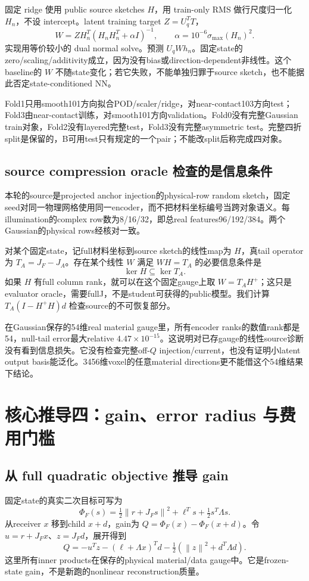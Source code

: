 \documentclass[UTF8,11pt,a4paper,fontset=fandol]{ctexart}
\newcommand{\norm}[1]{\left\lVert #1\right\rVert}
\begin{document}
固定 ridge 使用 public source sketches $H$，用 train-only RMS 做行尺度归一化 $H_n$，不设 intercept。latent training target $Z=U_q^TT$，
\[
 W=ZH_n^T(H_nH_n^T+\alpha I)^{-1},\qquad
 \alpha=10^{-6}\sigma_{\max}(H_n)^2.
\]
实现用等价较小的 dual normal solve。预测 $U_qW h_n$。固定state的zero/scaling/additivity成立，因为没有bias或direction-dependent非线性。这个baseline的 $W$ 不随state变化；若它失败，不能单独归罪于source sketch，也不能据此否定state-conditioned NN。

Fold1只用smooth101方向拟合POD/scaler/ridge，对near-contact103方向test；Fold3由near-contact训练，对smooth101方向validation。Fold0没有完整Gaussian train对象，Fold2没有layered完整test，Fold3没有完整asymmetric test。完整四折split是保留的，B可用test只有规定的一个pair；不能改split后称完成四对象。

\subsection{source compression oracle 检查的是信息条件}
本轮的source是projected anchor injection的physical-row random sketch，固定seed对同一物理网格使用同一encoder，而不把材料坐标编号当跨对象语义。每illumination的complex row数为8/16/32，即总real features96/192/384。两个Gaussian的physical rows经核对一致。

对某个固定state，记full材料坐标到source sketch的线性map为 $H$，真tail operator为 $T_A=J_F-J_A$。存在某个线性 $W$ 满足 $WH=T_A$ 的必要信息条件是
\[
 \ker H\subseteq\ker T_A.
\]
如果 $H$ 有full column rank，就可以在这个固定gauge上取 $W=T_AH^+$；这只是 evaluator oracle，需要fullJ，不是student可获得的public模型。我们计算 $T_A(I-H^+H)d$ 检查source的不可恢复部分。

在Gaussian保存的54维real material gauge里，所有encoder ranks的数值rank都是54，null-tail error最大relative $4.47\times10^{-15}$。这说明对已存gauge的线性source诊断没有看到信息损失。它没有检查完整off-$Q$ injection/current，也没有证明小latent output basis能泛化。3456维voxel的任意material directions更不能借这个54维结果下结论。

\section{核心推导四：gain、error radius 与费用门槛}
\subsection{从 full quadratic objective 推导 gain}
固定state的真实二次目标可写为
\[
 \Phi_F(s)=\tfrac12\norm{r+J_Fs}^2+\ell^Ts+\tfrac12s^T\Lambda s.
\]
从receiver $x$ 移到child $x+d$，gain为 $Q=\Phi_F(x)-\Phi_F(x+d)$。令 $u=r+J_Fx$、$z=J_Fd$，展开得到
\[
 Q=-u^Tz-(\ell+\Lambda x)^Td-\tfrac12(\norm{z}^2+d^T\Lambda d).
\]
这里所有inner products在保存的physical material/data gauge中。它是frozen-state gain，不是新跑的nonlinear reconstruction质量。
\end{document}
